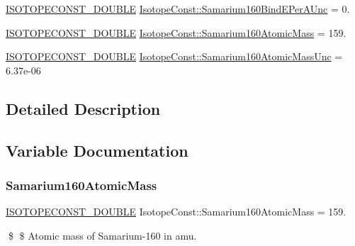 \begin{DoxyCompactItemize}
\mbox{\hyperlink{group___isotope_const-_macros_ga8f45a7272ce02c0b4c65c44636ed719a}{I\+S\+O\+T\+O\+P\+E\+C\+O\+N\+S\+T\+\_\+\+D\+O\+U\+B\+LE}} \mbox{\hyperlink{group___isotope_const-_samarium-_sm160_ga6ae6d4216136cf146b5688d34876e42d}{Isotope\+Const\+::\+Samarium160\+Bind\+E\+Per\+A\+Unc}} = 0.
\item 
\mbox{\hyperlink{group___isotope_const-_macros_ga8f45a7272ce02c0b4c65c44636ed719a}{I\+S\+O\+T\+O\+P\+E\+C\+O\+N\+S\+T\+\_\+\+D\+O\+U\+B\+LE}} \mbox{\hyperlink{group___isotope_const-_samarium-_sm160_ga9eb900d3694097ac39dfc8ab810823c5}{Isotope\+Const\+::\+Samarium160\+Atomic\+Mass}} = 159.
\item 
\mbox{\hyperlink{group___isotope_const-_macros_ga8f45a7272ce02c0b4c65c44636ed719a}{I\+S\+O\+T\+O\+P\+E\+C\+O\+N\+S\+T\+\_\+\+D\+O\+U\+B\+LE}} \mbox{\hyperlink{group___isotope_const-_samarium-_sm160_gad6807e8b40926ab06b29ab28b310c7d8}{Isotope\+Const\+::\+Samarium160\+Atomic\+Mass\+Unc}} = 6.\+37e-\/06
\end{DoxyCompactItemize}


\subsection{Detailed Description}


\subsection{Variable Documentation}
\mbox{\label{group___isotope_const-_samarium-_sm160_ga9eb900d3694097ac39dfc8ab810823c5}} 
\subsubsection{\texorpdfstring{Samarium160\+Atomic\+Mass}{Samarium160AtomicMass}}
{\footnotesize\ttfamily \mbox{\hyperlink{group___isotope_const-_macros_ga8f45a7272ce02c0b4c65c44636ed719a}{I\+S\+O\+T\+O\+P\+E\+C\+O\+N\+S\+T\+\_\+\+D\+O\+U\+B\+LE}} Isotope\+Const\+::\+Samarium160\+Atomic\+Mass = 159.}

\$ \$ Atomic mass of Samarium-\/160 in amu. \mbox{\label{group___isotope_const-_samarium-_sm160_gad6807e8b40926ab06b29ab28b310c7d8}} 
